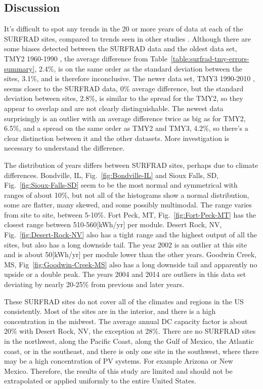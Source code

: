 \documentclass[conference]{IEEEtran}
\begin{document}
\subsection{Discussion}
It's difficult to spot any trends in the 20 or more years of data at each of the SURFRAD sites, compared to trends seen in other studies \cite{Muller2014}. Although there are some biases detected between the SURFRAD data and the oldest data set, TMY2 1960-1990 \cite{Marion1995}, the average difference from Table~\ref{table:surfrad-tmy-errors-summary}, 2.4\%, is on the same order as the standard deviation between the sites, 3.1\%, and is therefore inconclusive. The newer data set, TMY3 1990-2010 \cite{Wilcox2012}, seems closer to the SURFRAD data, 0\% average difference, but the standard deviation between sites, 2.8\%, is similar to the spread for the TMY2, so they appear to overlap and are not clearly distinguishable. The newest data surprisingly is an outlier with an average difference twice as big as for TMY2, 6.5\%, and a spread on the same order as TMY2 and TMY3, 4.2\%, so there's a clear distinction between it and the other datasets. More investigation is necessary to understand the difference.

The distribution of years differs between SURFRAD sites, perhaps due to climate differences. Bondville, IL, Fig.~\ref{fig:Bondville-IL} and Sioux Falls, SD, Fig.~\ref{fig:Sioux-Falls-SD} seem to be the most normal and symmetrical with ranges of about 10\%, but not all of the histograms show a normal distribution, some are flatter, many skewed, and some possibly multimodal. The range varies from site to site, between 5-10\%. Fort Peck, MT, Fig.~\ref{fig:Fort-Peck-MT} has the closest range between 510-560[kWh/yr] per module. Desert Rock, NV, Fig.~\ref{fig:Desert-Rock-NV} also has a tight range and the highest output of all the sites, but also has a long downside tail. The year 2002 is an outlier at this site and is about 50[kWh/yr] per module lower than the other years. Goodwin Creek, MS, Fig~\ref{fig:Goodwin-Creek-MS} also has a long downside tail and apparently no upside or a double peak. The years 2004 and 2014 are outliers in this data set deviating by nearly 20-25\% from previous and later years.

These SURFRAD sites do not cover all of the climates and regions in the US consistently. Most of the sites are in the interior, and there is a high concentration in the midwest. The average annual DC capacity factor is about 20\% with Desert Rock, NV, the exception at 28\%. There are no SURFRAD sites in the northwest, along the Pacific Coast, along the Gulf of Mexico, the Atlantic coast, or in the southeast, and there is only one site in the southwest, where there may be a high concentration of PV systems. For example Arizona or New Mexico. Therefore, the results of this study are limited and should not be extrapolated or applied uniformly to the entire United States.
\end{document}
